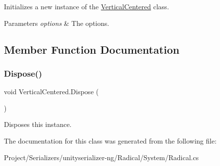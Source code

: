 Initializes a new instance of the \hyperlink{class_vertical_centered}{Vertical\+Centered} class. 


\begin{DoxyParams}{Parameters}
{\em options} & The options.\\
\hline
\end{DoxyParams}


\subsection{Member Function Documentation}
\mbox{\label{class_vertical_centered_a705b958f5fe1f45e3aca234daa1be378}} 
\subsubsection{\texorpdfstring{Dispose()}{Dispose()}}
{\footnotesize\ttfamily void Vertical\+Centered.\+Dispose (\begin{DoxyParamCaption}{ }\end{DoxyParamCaption})\hspace{0.3cm}{\ttfamily [inline]}}



Disposes this instance. 



The documentation for this class was generated from the following file\+:\begin{DoxyCompactItemize}
\item 
Project/\+Serializers/unityserializer-\/ng/\+Radical/\+System/Radical.\+cs\end{DoxyCompactItemize}

